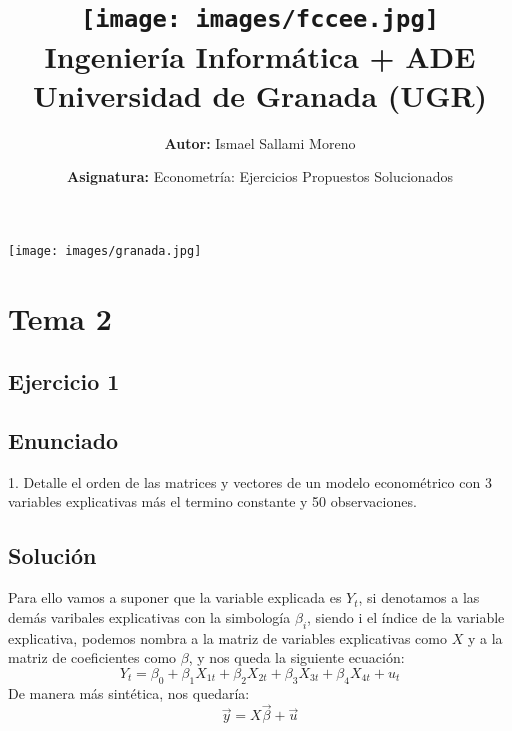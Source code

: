 \documentclass[a4paper,12pt]{article}
\title{
    \vspace{-2cm}
    \texttt{[image: images/fccee.jpg]} \\ %
    \LARGE Ingeniería Informática + ADE\\
    \large Universidad de Granada (UGR)\\[1cm]
}
\author{\textbf{Autor:} Ismael Sallami Moreno}
\date{\textbf{Asignatura:} Econometría: Ejercicios Propuestos Solucionados}
\begin{document}
\maketitle
\thispagestyle{empty}

\begin{center}
    \texttt{[image: images/granada.jpg]} \\ %
    \vfill
\end{center}

\newpage

\tableofcontents
\newpage

\section{Tema 2}

\subsection{Ejercicio 1}
\subsection*{Enunciado}
1. Detalle el orden de las matrices y vectores de un modelo econométrico con 3 variables explicativas más el termino constante y 50 observaciones.

\subsection*{Solución}

Para ello vamos a suponer que la variable explicada es $Y_t$, si denotamos a las demás varibales explicativas con la simbología $\beta_i$, siendo i el índice de la variable explicativa, podemos nombra a la matriz de variables explicativas como $X$ y a la matriz de coeficientes como $\beta$, y nos queda la siguiente ecuación:  
\begin{equation}
    Y_t = \beta_0 + \beta_1X_{1t} + \beta_2X_{2t} + \beta_3X_{3t} + \beta_4X_{4t} + u_t
\end{equation} 
De manera más sintética, nos quedaría:
\begin{equation}
    \vec{y} = X \vec{\beta} + \vec{u}
\end{equation}
\end{document}
